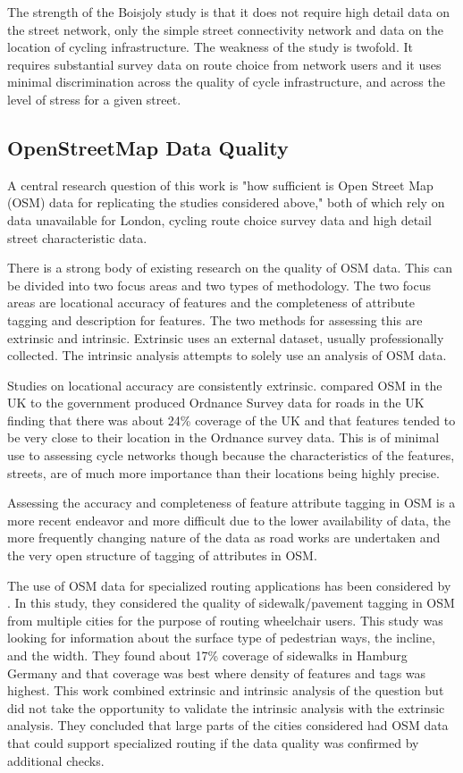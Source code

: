 The strength of the Boisjoly study is that it does not require high detail data on the street network, only the simple street connectivity network and data on the location of cycling infrastructure. The weakness of the study is twofold. It requires substantial survey data on route choice from network users and it uses minimal discrimination across the quality of cycle infrastructure, and across the level of stress for a given street. 

\subsection{OpenStreetMap Data Quality}\label{OSMQuality}

A central research question of this work is "how sufficient is Open Street Map (OSM) data for replicating the studies considered above," both of which rely on data unavailable for London, cycling route choice survey data and high detail street characteristic data. 

There is a strong body of existing research on the quality of OSM data. This can be divided into two focus areas and two types of methodology. The two focus areas are locational accuracy of features and the completeness of attribute tagging and description for features. The two methods for assessing this are extrinsic and intrinsic. Extrinsic uses an external dataset, usually professionally collected. The intrinsic analysis attempts to solely use an analysis of OSM data. 

Studies on locational accuracy are consistently extrinsic. \textcite{haklay2010good} compared OSM in the UK to the government produced Ordnance Survey data for roads in the UK finding that there was about 24\% coverage of the UK and that features tended to be very close to their location in the Ordnance survey data. This is of minimal use to assessing cycle networks though because the characteristics of the features, streets, are of much more importance than their locations being highly precise. 

Assessing the accuracy and completeness of feature attribute tagging in OSM is a more recent endeavor and more difficult due to the lower availability of data, the more frequently changing nature of the data as road works are undertaken and the very open structure of tagging of attributes in OSM.  

The use of OSM data for specialized routing applications has been considered by \textcite{mobasheri2017crowdsourced}. In this study, they considered the quality of sidewalk/pavement tagging in OSM from multiple cities for the purpose of routing wheelchair users. This study was looking for information about the surface type of pedestrian ways, the incline, and the width. They found about 17\% coverage of sidewalks in Hamburg Germany and that coverage was best where density of features and tags was highest. This work combined extrinsic and intrinsic analysis of the question but did not take the opportunity to validate the intrinsic analysis with the extrinsic analysis. They concluded that large parts of the cities considered had OSM data that could support specialized routing if the data quality was confirmed by additional checks. 


